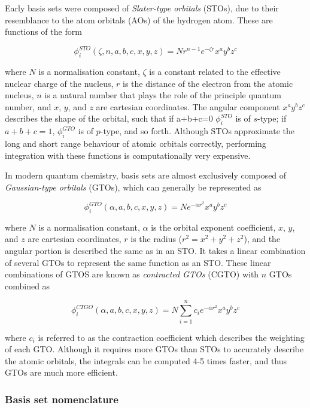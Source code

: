Early basis sets were composed of \emph{Slater-type orbitals} (STOs), due to their resemblance to the atom orbitals (AOs) of the hydrogen atom. These are functions of the form

\begin{equation}
\phi_i^{STO}(\zeta,n,a,b,c,x,y,z) = Nr^{n-1}e^{-\zeta r}x^ay^bz^c
\end{equation}

\noindent where $N$ is a normalisation constant, $\zeta$ is a constant related
to the effective nuclear charge of the nucleus, $r$ is the distance of the
electron from the atomic nucleus, $n$ is a natural number that plays the role of
the principle quantum number, and $x$, $y$, and $z$ are cartesian coordinates.
The angular component $x^ay^bz^c$ describes the shape of the orbital, such that
if a+b+c=0 $\phi_i^{STO}$ is of $s$-type; if $a+b+c=1$, $\phi_i^{GTO}$ is of
$p$-type, and so forth. Although STOs approximate the long and short range
behaviour of atomic orbitals correctly, performing integration with these
functions is computationally very expensive.

In modern quantum chemistry, basis sets are almost exclusively composed of
\emph{Gaussian-type orbitals} (GTOs), which can generally be represented as

\begin{equation}
\phi_i^{GTO}(\alpha,a,b,c,x,y,z) = N e^{-\alpha r^2} x^ay^bz^c
\end{equation}

\noindent where $N$ is a normalisation constant, $\alpha$ is the orbital exponent coefficient, $x$, $y$, and $z$ are cartesian coordinates, $r$ is the radius ($r^2=x^2+y^2+z^2$), and the angular portion is described the same as in an STO. It takes a linear combination of several GTOs to represent the same function as an STO. These linear combinations of GTOS are known as \emph{contracted GTOs} (CGTO) with $n$ GTOs combined as

\begin{equation}
\phi_i^{CTGO}(\alpha,a,b,c,x,y,z) = N \sum_{i=1}^n c_i e^{-\alpha r^2} x^ay^bz^c
\end{equation}

\noindent where $c_i$ is referred to as the contraction coefficient which describes the weighting of each GTO. Although it requires more GTOs than STOs to accurately describe the atomic orbitals, the integrals can be computed 4-5 times faster, and thus GTOs are much more efficient.\cite{Gill1994}

\subsubsection{Basis set nomenclature}

